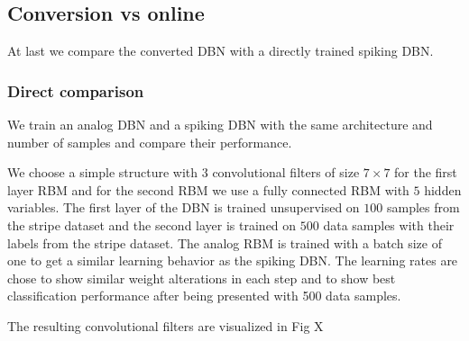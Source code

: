 \subsection{Conversion vs online}

At last we compare the converted DBN with a directly trained spiking DBN.

\subsubsection{Direct comparison}

We train an analog DBN and a spiking DBN with the same architecture and number of samples and compare their performance.

We choose a simple structure with $3$ convolutional filters of size $7 \times 7$ for the first layer RBM and for the second RBM we use a fully connected RBM with $5$ hidden variables.
The first layer of the DBN is trained unsupervised on $100$ samples from the stripe dataset and the second layer is trained on $500$ data samples with their labels from the stripe dataset.
The analog RBM is trained with a batch size of one to get a similar learning behavior as the spiking DBN. 
The learning rates are chose to show similar weight alterations in each step and to show best classification performance after being presented with 500 data samples.

The resulting convolutional filters are visualized in Fig X 

